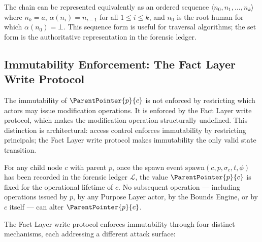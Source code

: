 The chain can be represented equivalently as an ordered sequence $\langle n_0, n_1, \ldots, n_k \rangle$ where $n_k = a$, $\alpha(n_i) = n_{i-1}$ for all $1 \leq i \leq k$, and $n_0$ is the root human for which $\alpha(n_0) = \bot$. This sequence form is useful for traversal algorithms; the set form is the authoritative representation in the forensic ledger.

\subsection{Immutability Enforcement: The Fact Layer Write Protocol}
\label{sec:rs-immutability-enforcement}

The immutability of $\ParentPointer{p}{c}$ is not enforced by restricting which actors may issue modification operations. It is enforced by the Fact Layer write protocol, which makes the modification operation structurally undefined. This distinction is architectural: access control enforces immutability by restricting principals; the Fact Layer write protocol makes immutability the only valid state transition.

\begin{prop}
\label{prop:rs-parent-pointer-immutable}
For any child node $c$ with parent $p$, once the spawn event $\mathrm{spawn}(c, p, \sigma_c, t, \phi)$ has been recorded in the forensic ledger $\mathcal{L}$, the value $\ParentPointer{p}{c}$ is fixed for the operational lifetime of $c$. No subsequent operation --- including operations issued by $p$, by any Purpose Layer actor, by the Bounds Engine, or by $c$ itself --- can alter $\ParentPointer{p}{c}$.
\end{prop}

The Fact Layer write protocol enforces immutability through four distinct mechanisms, each addressing a different attack surface:

